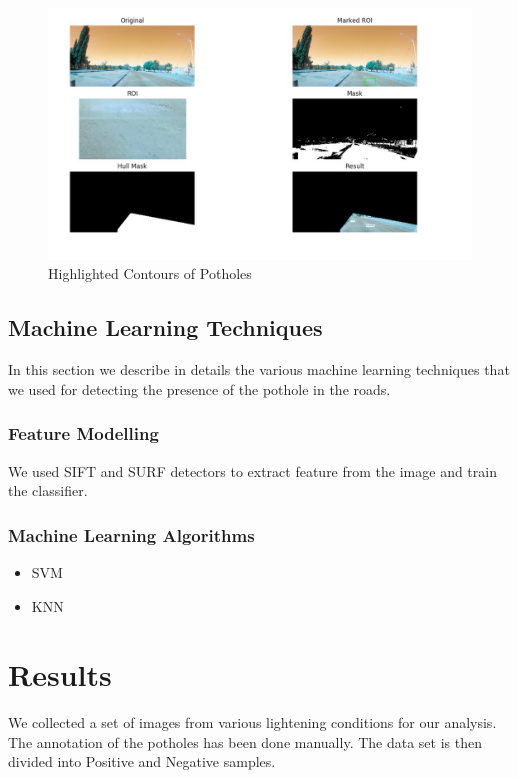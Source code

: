 \documentclass[journal]{IEEEtran}
\begin{document}
\begin{figure}[!h]
\begin{center}
\includegraphics[scale=0.25]{Images/roi.jpg}
\end{center}
\caption{Highlighted Contours of Potholes}
\end{figure}

\subsection{Machine Learning Techniques}

In this section we describe in details the various machine learning techniques that we used for detecting the presence of the pothole in the roads.

\subsubsection{Feature Modelling}

We used SIFT and SURF detectors to extract feature from the image and train the classifier.

\subsubsection{Machine Learning Algorithms}

\begin{itemize}
\item SVM

\item KNN

\end{itemize}

\section{Results}
We collected a set of images from various lightening conditions for our analysis. The annotation of the potholes has been done manually. The data set is then divided into Positive and Negative samples. 
\end{document}
